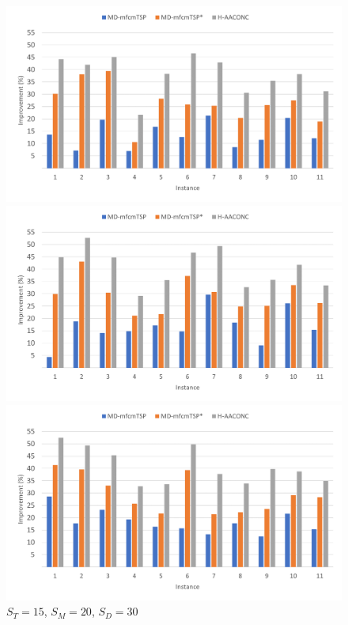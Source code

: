 \documentclass{article}
\begin{document}
	\clearpage
	\onecolumn
	\begin{figure}[h]
		\centering
		\begin{minipage}{0.33\textwidth}
			\centering
			\includegraphics[scale=0.42]{small_15-15-15}\;
			\caption{$S_T=15$, $S_M=15$, $S_D=15$}
			\label{fig:15-15-15}
		\end{minipage}
		\begin{minipage}{0.33\textwidth}
			\centering
			\includegraphics[scale=0.42]{small_15-20-20}\;
			\caption{$S_T=15$, $S_M=20$, $S_D=20$}
			\label{fig:15-20-20}
		\end{minipage}
		\begin{minipage}{0.33\textwidth}
			\centering
			\includegraphics[scale=0.42]{small_15-20-30}\;
			\caption{$S_T=15$, $S_M=20$, $S_D=30$}
			\label{fig:15-20-30}
		\end{minipage}
	\end{figure}
	
\end{document}
